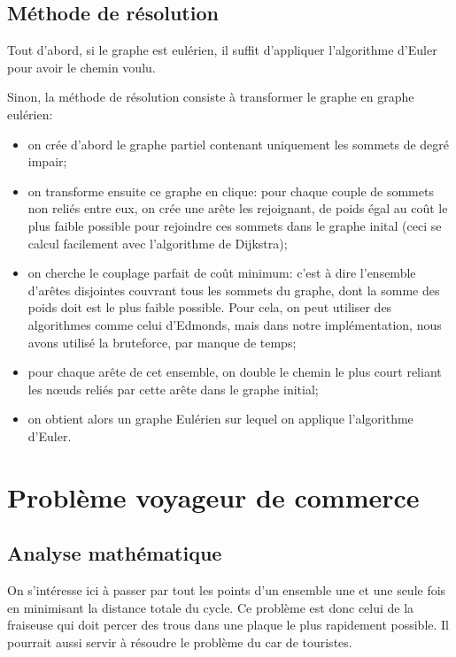 \documentclass{scrartcl}
\begin{document}
  \subsection{Méthode de résolution}
    Tout d'abord, si le graphe est eulérien, il suffit d'appliquer l'algorithme
    d'Euler pour avoir le chemin voulu.

    Sinon, la méthode de résolution consiste à transformer le graphe en graphe
    eulérien:
    \begin{itemize}
      \item on crée d'abord le graphe partiel contenant uniquement les sommets
        de degré impair;
      \item on transforme ensuite ce graphe en clique: pour chaque couple de
        sommets non reliés entre eux, on crée une arête les rejoignant,
        de poids égal au coût le plus faible possible pour rejoindre ces
        sommets dans le graphe inital (ceci se calcul facilement avec
        l'algorithme de Dijkstra);
      \item on cherche le couplage parfait de coût minimum: c'est à dire
        l'ensemble d'arêtes disjointes couvrant tous les sommets du graphe,
        dont la somme des poids doit est le plus faible possible.
        Pour cela, on peut utiliser des algorithmes comme celui d'Edmonds, mais
        dans notre implémentation, nous avons utilisé la bruteforce, par manque
        de temps;
      \item pour chaque arête de cet ensemble, on double le chemin le plus court
        reliant les nœuds reliés par cette arête dans le graphe initial;
      \item on obtient alors un graphe Eulérien sur lequel on applique
        l'algorithme d'Euler.
    \end{itemize}

\section{Problème voyageur de commerce} \label{sec:tsp}
  \subsection{Analyse mathématique}
    On s'intéresse ici à passer par tout les points d'un ensemble une et une
    seule fois en minimisant la distance totale du cycle. Ce problème est donc
    celui de la fraiseuse qui doit percer des trous dans une plaque le plus
    rapidement possible. Il pourrait aussi servir à résoudre le problème du car
    de touristes.
\end{document}
